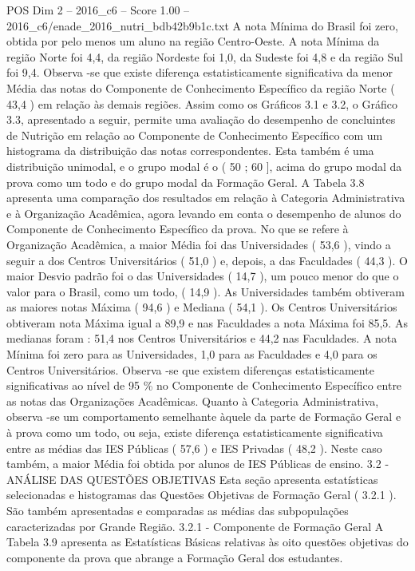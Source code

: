 \begin{textsample}{POS Dim 2 – 2016\_c6 – Score 1.00 – 2016\_c6/enade\_2016\_nutri\_bdb42b9b1c.txt}
A nota Mínima do Brasil foi zero, obtida por pelo menos um aluno na região Centro-Oeste.
A nota Mínima da região Norte foi 4,4, da região Nordeste foi 1,0, da Sudeste foi 4,8 e da região Sul foi 9,4.
Observa -se que existe diferença estatisticamente significativa da menor Média das notas do Componente de Conhecimento Específico da região Norte ( 43,4 ) em relação às demais regiões.
Assim como os Gráficos 3.1 e 3.2, o Gráfico 3.3, apresentado a seguir, permite uma avaliação do desempenho de concluintes de Nutrição em relação ao Componente de Conhecimento Específico com um histograma da distribuição das notas correspondentes.
Esta também é uma distribuição unimodal, e o grupo modal é o ( 50 ; 60 ], acima do grupo modal da prova como um todo e do grupo modal da Formação Geral.
A Tabela 3.8 apresenta uma comparação dos resultados em relação à Categoria Administrativa e à Organização Acadêmica, agora levando em conta o desempenho de alunos do Componente de Conhecimento Específico da prova.
No que se refere à Organização Acadêmica, a maior Média foi das Universidades ( 53,6 ), vindo a seguir a dos Centros Universitários ( 51,0 ) e, depois, a das Faculdades ( 44,3 ).
O maior Desvio padrão foi o das Universidades ( 14,7 ), um pouco menor do que o valor para o Brasil, como um todo, ( 14,9 ).
As Universidades também obtiveram as maiores notas Máxima ( 94,6 ) e Mediana ( 54,1 ).
Os Centros Universitários obtiveram nota Máxima igual a 89,9 e nas Faculdades a nota Máxima foi 85,5.
As medianas foram : 51,4 nos Centros Universitários e 44,2 nas Faculdades.
A nota Mínima foi zero para as Universidades, 1,0 para as Faculdades e 4,0 para os Centros Universitários.
Observa -se que existem diferenças estatisticamente significativas ao nível de 95 \% no Componente de Conhecimento Específico entre as notas das Organizações Acadêmicas.
Quanto à Categoria Administrativa, observa -se um comportamento semelhante àquele da parte de Formação Geral e à prova como um todo, ou seja, existe diferença estatisticamente significativa entre as médias das IES Públicas ( 57,6 ) e IES Privadas ( 48,2 ).
Neste caso também, a maior Média foi obtida por alunos de IES Públicas de ensino. 3.2 - ANÁLISE DAS QUESTÕES OBJETIVAS Esta seção apresenta estatísticas selecionadas e histogramas das Questões Objetivas de Formação Geral ( 3.2.1 ).
São também apresentadas e comparadas as médias das subpopulações caracterizadas por Grande Região. 3.2.1 - Componente de Formação Geral A Tabela 3.9 apresenta as Estatísticas Básicas relativas às oito questões objetivas do componente da prova que abrange a Formação Geral dos estudantes.

\end{textsample}
